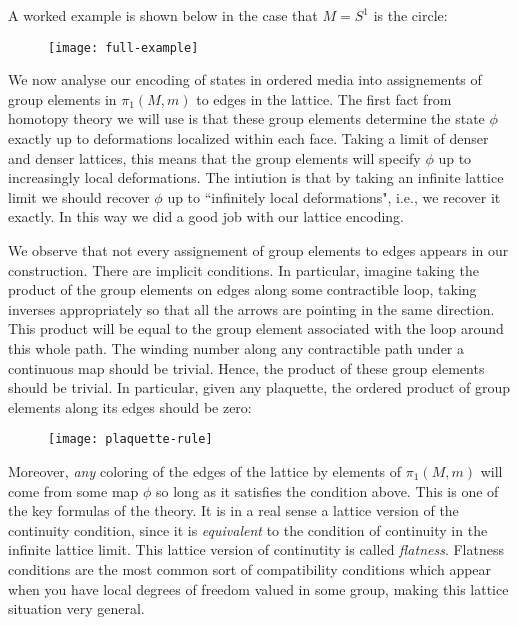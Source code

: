 A worked example is shown below in the case that $M=S^1$ is the circle:

\begin{figure}[h]
\begin{center}
\texttt{[image: full-example]}
\end{center}
\end{figure}

We now analyse our encoding of states in ordered media into assignements of group elements in $\pi_1(M,m)$ to edges in the lattice. The first fact from homotopy theory we will use is that these group elements determine the state $\phi$ exactly up to deformations localized within each face. Taking a limit of denser and denser lattices, this means that the group elements will specify $\phi$ up to increasingly local deformations. The intiution is that by taking an infinite lattice limit we should recover $\phi$ up to ``infinitely local deformations", i.e., we recover it exactly. In this way we did a good job with our lattice encoding.

We observe that not every assignement of group elements to edges appears in our construction. There are implicit conditions. In particular, imagine taking the product of the group elements on edges along some contractible loop, taking inverses appropriately so that all the arrows are pointing in the same direction. This product will be equal to the group element associated with the loop around this whole path. The winding number along any contractible path under a continuous map should be trivial. Hence, the product of these group elements should be trivial. In particular, given any plaquette, the ordered product of group elements along its edges should be zero:

\begin{figure}[h]
\begin{center}
\texttt{[image: plaquette-rule]}
\end{center}
\end{figure}

Moreover, \textit{any} coloring of the edges of the lattice by elements of $\pi_1(M,m)$ will come from some map $\phi$ so long as it satisfies the condition above. This is one of the key formulas of the theory. It is in a real sense a lattice version of the continuity condition, since it is \textit{equivalent} to the condition of continuity in the infinite lattice limit. This lattice version of continutity is called \textit{flatness}. Flatness conditions are the most common sort of compatibility conditions which appear when you have local degrees of freedom valued in some group, making this lattice situation very general.

